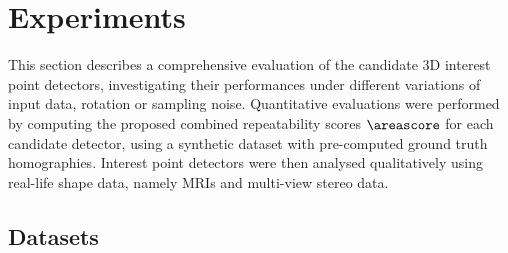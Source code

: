 \section{Experiments}
\label{sec/eval/experiments}

This section describes a comprehensive evaluation of the candidate 3D interest point detectors, investigating their performances under different variations of input data, \eg rotation or sampling noise. Quantitative evaluations were performed by computing the proposed combined repeatability scores $\areascore$ for each candidate detector, using a synthetic dataset with pre-computed ground truth homographies. Interest point detectors were then analysed qualitatively using real-life shape data, namely MRIs and multi-view stereo data. 

\subsection{Datasets}
\label{sec/eval/testdata}


